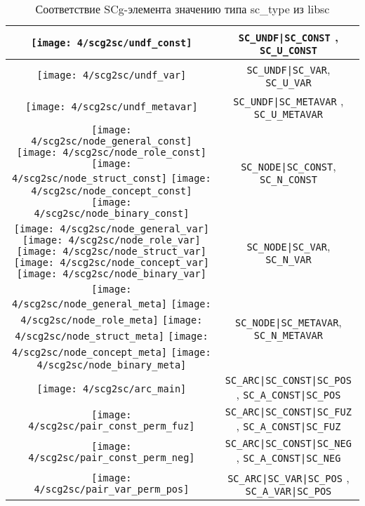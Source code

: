 \begin{table}[ht]
  \caption{Соответствие SCg-элемента значению типа sc\_type из libsc}
  \centering
  \begin{tabular}{|c|c|}
    \hline
    \texttt{[image: 4/scg2sc/undf\_const]} & \verb+SC_UNDF|SC_CONST+
    , \verb+SC_U_CONST+ \\

    \hline
    \texttt{[image: 4/scg2sc/undf\_var]} & \verb+SC_UNDF|SC_VAR+, \verb+SC_U_VAR+ \\

    \hline
    \texttt{[image: 4/scg2sc/undf\_metavar]} & \verb+SC_UNDF|SC_METAVAR+
    , \verb+SC_U_METAVAR+ \\

    \hline
    \texttt{[image: 4/scg2sc/node\_general\_const]}
    \texttt{[image: 4/scg2sc/node\_role\_const]}
    \texttt{[image: 4/scg2sc/node\_struct\_const]}
    \texttt{[image: 4/scg2sc/node\_concept\_const]}
    \texttt{[image: 4/scg2sc/node\_binary\_const]}
    & \verb+SC_NODE|SC_CONST+, \verb+SC_N_CONST+ \\

    \hline
    \texttt{[image: 4/scg2sc/node\_general\_var]}
    \texttt{[image: 4/scg2sc/node\_role\_var]}
    \texttt{[image: 4/scg2sc/node\_struct\_var]}
    \texttt{[image: 4/scg2sc/node\_concept\_var]}
    \texttt{[image: 4/scg2sc/node\_binary\_var]}
    & \verb+SC_NODE|SC_VAR+, \verb+SC_N_VAR+ \\

    \hline
    \texttt{[image: 4/scg2sc/node\_general\_meta]}
    \texttt{[image: 4/scg2sc/node\_role\_meta]}
    \texttt{[image: 4/scg2sc/node\_struct\_meta]}
    \texttt{[image: 4/scg2sc/node\_concept\_meta]}
    \texttt{[image: 4/scg2sc/node\_binary\_meta]}
    & \verb+SC_NODE|SC_METAVAR+, \verb+SC_N_METAVAR+ \\

    \hline
    \texttt{[image: 4/scg2sc/arc\_main]} & \verb+SC_ARC|SC_CONST|SC_POS+
    , \verb+SC_A_CONST|SC_POS+ \\

    \hline
    \texttt{[image: 4/scg2sc/pair\_const\_perm\_fuz]} & \verb+SC_ARC|SC_CONST|SC_FUZ+
    , \verb+SC_A_CONST|SC_FUZ+ \\

    \hline
    \texttt{[image: 4/scg2sc/pair\_const\_perm\_neg]} & \verb+SC_ARC|SC_CONST|SC_NEG+
    , \verb+SC_A_CONST|SC_NEG+ \\

    \hline
    \texttt{[image: 4/scg2sc/pair\_var\_perm\_pos]} & \verb+SC_ARC|SC_VAR|SC_POS+
    , \verb+SC_A_VAR|SC_POS+ \\


\end{tabular}
\end{table}
